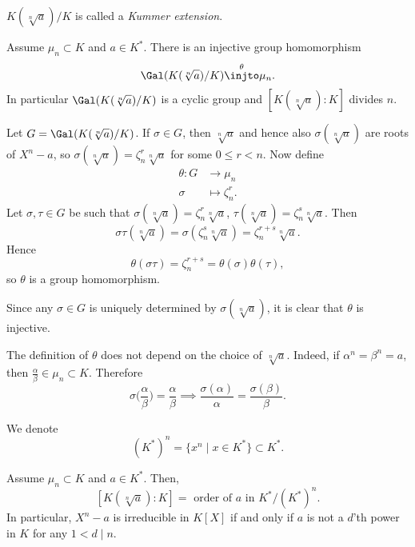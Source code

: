 \documentclass[12pt]{article}
\begin{document}
\begin{definition}
	$K(\sqrt[n]a)/K$ is called a \emph{Kummer extension}.
\end{definition}

\begin{theorem}
	Assume $\mu_n \subset K$ and $a \in K^{\ast}$. There is an injective group homomorphism
	\[
		\Gal(K(\sqrt[n]a)/K) \overset{\theta}{\injto} \mu_n.
	\]
	In particular $\Gal(K(\sqrt[n]a)/K)$ is a cyclic group and $[K(\sqrt[n]a):K]$ divides $n$.
\end{theorem}

\begin{proofbox}
	Let $G = \Gal(K(\sqrt[n]a)/K)$. If $\sigma \in G$, then $\sqrt[n]a$ and hence also $\sigma(\sqrt[n]a)$ are roots of $X^n - a$, so $\sigma(\sqrt[n]a) = \zeta_n^r \sqrt[n]a$ for some $0 \leq r < n$. Now define
	\begin{align*}
		\theta : G &\to \mu_n \\
		\sigma &\mapsto \zeta_n^r.
	\end{align*}
	Let $\sigma, \tau \in G$ be such that $\sigma(\sqrt[n]a) = \zeta_n^r \sqrt[n]a$, $\tau(\sqrt[n]a) = \zeta_n^s \sqrt[n]a$. Then
	\[
		\sigma \tau(\sqrt[n]a) = \sigma(\zeta_n^s \sqrt[n]a) = \zeta_n^{r+s} \sqrt[n]a.
	\]
	Hence
	\[
	\theta(\sigma \tau) = \zeta_n^{r+s} = \theta(\sigma) \theta(\tau),
	\]
	so $\theta$ is a group homomorphism.

	Since any $\sigma \in G$ is uniquely determined by $\sigma(\sqrt[n]a)$, it is clear that $\theta$ is injective.
\end{proofbox}

\begin{remark}
	The definition of $\theta$ does not depend on the choice of $\sqrt[n]a$. Indeed, if $\alpha^n = \beta^n = a$, then $\frac{\alpha}{\beta} \in \mu_n \subset K$. Therefore
	\[
	\sigma \biggl( \frac{\alpha}{\beta} \biggr) = \frac{\alpha}{\beta} \implies \frac{\sigma(\alpha)}{\alpha} = \frac{\sigma(\beta)}{\beta}.
	\]
\end{remark}

We denote
\[
	(K^{\ast})^n = \{x^n \mid x \in K^{\ast}\} \subset K^{\ast}.
\]

\begin{corollary}
	Assume $\mu_n \subset K$ and $a \in K^{\ast}$. Then,
	\[
		[K(\sqrt[n]a) : K] = \text{ order of } a \text{ in } K^{\ast}/(K^{\ast})^n.
	\]
	In particular, $X^n - a$ is irreducible in $K[X]$ if and only if $a$ is not a $d$'th power in $K$ for any $1 < d \mid n$.
\end{corollary}
\end{document}

